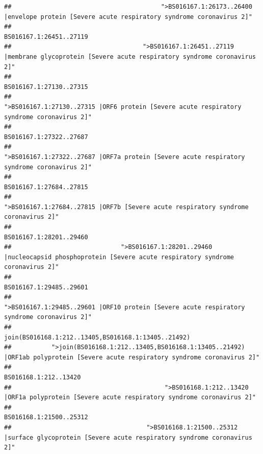 \documentclass[
]{article}
\begin{document}
\begin{verbatim}
##                                         ">BS016167.1:26173..26400 |envelope protein [Severe acute respiratory syndrome coronavirus 2]" 
##                                                                                                                BS016167.1:26451..27119 
##                                    ">BS016167.1:26451..27119 |membrane glycoprotein [Severe acute respiratory syndrome coronavirus 2]" 
##                                                                                                                BS016167.1:27130..27315 
##                                             ">BS016167.1:27130..27315 |ORF6 protein [Severe acute respiratory syndrome coronavirus 2]" 
##                                                                                                                BS016167.1:27322..27687 
##                                            ">BS016167.1:27322..27687 |ORF7a protein [Severe acute respiratory syndrome coronavirus 2]" 
##                                                                                                                BS016167.1:27684..27815 
##                                                    ">BS016167.1:27684..27815 |ORF7b [Severe acute respiratory syndrome coronavirus 2]" 
##                                                                                                                BS016167.1:28201..29460 
##                              ">BS016167.1:28201..29460 |nucleocapsid phosphoprotein [Severe acute respiratory syndrome coronavirus 2]" 
##                                                                                                                BS016167.1:29485..29601 
##                                            ">BS016167.1:29485..29601 |ORF10 protein [Severe acute respiratory syndrome coronavirus 2]" 
##                                                                                    join(BS016168.1:212..13405,BS016168.1:13405..21492) 
##           ">join(BS016168.1:212..13405,BS016168.1:13405..21492) |ORF1ab polyprotein [Severe acute respiratory syndrome coronavirus 2]" 
##                                                                                                                  BS016168.1:212..13420 
##                                          ">BS016168.1:212..13420 |ORF1a polyprotein [Severe acute respiratory syndrome coronavirus 2]" 
##                                                                                                                BS016168.1:21500..25312 
##                                     ">BS016168.1:21500..25312 |surface glycoprotein [Severe acute respiratory syndrome coronavirus 2]" 

\end{verbatim}
\end{document}
